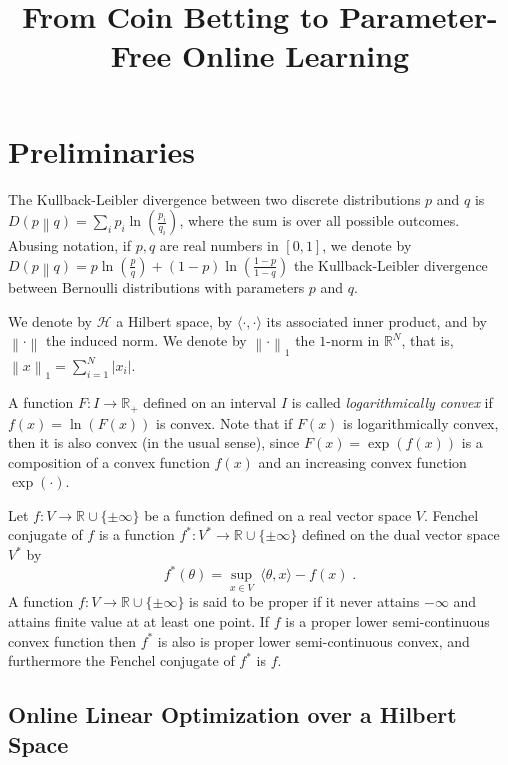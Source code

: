 \documentclass{colt2016_empty} %
\title{From Coin Betting to Parameter-Free Online Learning}
\newcommand{\R}{\mathbb{R}}     %
\renewcommand{\H}{\mathcal{H}}  %
\newcommand{\KL}[2]{D\left({#1}\middle\|{#2}\right)}  %
\newcommand{\norm}[1]{\left\|{#1}\right\|}
\begin{document}
\maketitle

\section{Preliminaries}

The Kullback-Leibler divergence between two discrete
distributions $p$ and $q$ is $\KL{p}{q} = \sum_{i} p_i \ln\left( \frac{p_i}{q_i} \right)$,
where the sum is over all possible outcomes. Abusing notation, if $p,q$ are real
numbers in $[0,1]$, we denote by
$\KL{p}{q} = p \ln \left(\frac{p}{q} \right) + (1-p) \ln \left(\frac{1-p}{1-q} \right)$
the Kullback-Leibler divergence between Bernoulli distributions with parameters
$p$ and $q$.

We denote by $\H$ a Hilbert space, by $\langle \cdot, \cdot\rangle$ its
associated inner product, and by $\norm{\cdot}$ the induced norm.
We denote by $\norm{\cdot}_1$ the $1$-norm in $\R^N$, that is,
$\norm{x}_1 = \sum_{i=1}^N |x_i|$.

A function $F:I \to \R_+$ defined on an interval $I$ is called
\emph{logarithmically convex} if $f(x) = \ln(F(x))$ is convex. Note that if
$F(x)$ is logarithmically convex, then it is also convex (in the usual sense),
since $F(x) = \exp(f(x))$ is a composition of a convex function $f(x)$ and an
increasing convex function $\exp(\cdot)$.

Let $f:V \to \R \cup \{\pm\infty\}$ be a function defined on a real vector space
$V$. Fenchel conjugate of $f$ is a function $f^*:V^* \to \R \cup \{\pm \infty\}$
defined on the dual vector space $V^*$ by
$$
f^*(\theta) = \sup_{x \in V} \ \langle \theta, x \rangle - f(x) \; .
$$
A function $f:V \to \R \cup \{\pm \infty\}$ is said to be proper if it never
attains $-\infty$ and attains finite value at at least one point. If $f$ is a
proper lower semi-continuous convex function then $f^*$ is also is proper lower
semi-continuous convex, and furthermore the Fenchel conjugate of $f^*$ is $f$.

\subsection{Online Linear Optimization over a Hilbert Space}
\end{document}

